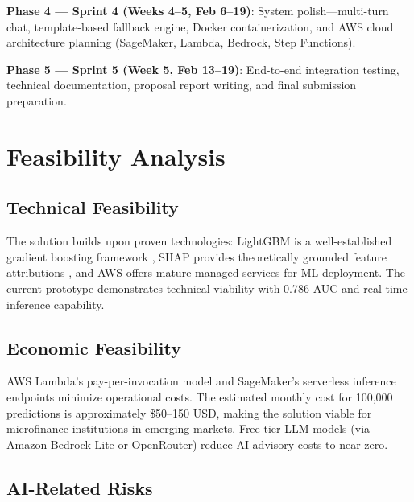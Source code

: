 \documentclass[12pt,a4paper]{article}
\begin{document}
\textbf{Phase 4 --- Sprint 4 (Weeks 4--5, Feb 6--19)}: System polish---multi-turn chat, template-based fallback engine, Docker containerization, and AWS cloud architecture planning (SageMaker, Lambda, Bedrock, Step Functions).

\textbf{Phase 5 --- Sprint 5 (Week 5, Feb 13--19)}: End-to-end integration testing, technical documentation, proposal report writing, and final submission preparation.

\section{Feasibility Analysis}

\subsection{Technical Feasibility}
The solution builds upon proven technologies: LightGBM is a well-established gradient boosting framework \cite{ke2017lightgbm}, SHAP provides theoretically grounded feature attributions \cite{lundberg2017shap}, and AWS offers mature managed services for ML deployment. The current prototype demonstrates technical viability with 0.786 AUC and real-time inference capability.

\subsection{Economic Feasibility}
AWS Lambda's pay-per-invocation model and SageMaker's serverless inference endpoints minimize operational costs. The estimated monthly cost for 100,000 predictions is approximately \$50--150 USD, making the solution viable for microfinance institutions in emerging markets. Free-tier LLM models (via Amazon Bedrock Lite or OpenRouter) reduce AI advisory costs to near-zero.

\subsection{AI-Related Risks}
\end{document}
